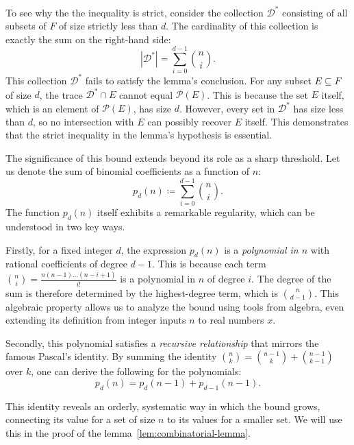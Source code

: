\begin{remark}

    To see why the the inequality is strict, consider the collection $\mathcal{D}^*$ consisting of all subsets of $F$ of size strictly less than $d$. The cardinality of this collection is exactly the sum on the right-hand side:
    \[
        |\mathcal{D}^*| = \sum_{i=0}^{d-1}\binom{n}{i}.
    \]
    This collection $\mathcal{D}^*$ fails to satisfy the lemma's conclusion. For any subset $E \subseteq F$ of size $d$, the trace $\mathcal{D}^* \cap E$ cannot equal $\mathcal{P}(E)$. This is because the set $E$ itself, which is an element of $\mathcal{P}(E)$, has size $d$. However, every set in $\mathcal{D}^*$ has size less than $d$, so no intersection with $E$ can possibly recover $E$ itself. This demonstrates that the strict inequality in the lemma's hypothesis is essential.

    The significance of this bound extends beyond its role as a sharp threshold. Let us denote the sum of binomial coefficients as a function of $n$:
    \begin{equation}
        \label{eq:def-pascal-identity}
        p_d(n) \coloneq \sum_{i=0}^{d-1}\binom{n}{i}.
    \end{equation}
    The function $p_d(n)$ itself exhibits a remarkable regularity, which can be understood in two key ways.

    Firstly, for a fixed integer $d$, the expression $p_d(n)$ is a \textit{polynomial in $n$} with rational coefficients of degree $d-1$. This is because each term $\binom{n}{i} = \frac{n(n-1)\dots(n-i+1)}{i!}$ is a polynomial in $n$ of degree $i$. The degree of the sum is therefore determined by the highest-degree term, which is $\binom{n}{d-1}$. This algebraic property allows us to analyze the bound using tools from algebra, even extending its definition from integer inputs $n$ to real numbers $x$.

    Secondly, this polynomial satisfies a \textit{recursive relationship} that mirrors the famous Pascal's identity. By summing the identity $\binom{n}{k} = \binom{n-1}{k} + \binom{n-1}{k-1}$ over $k$, one can derive the following  for the polynomials:
    \begin{equation}
        \label{eq:pascal-identity}
        p_d(n) = p_d(n-1) + p_{d-1}(n-1).
    \end{equation}

    This identity reveals an orderly, systematic way in which the bound grows, connecting its value for a set of size $n$ to its values for a smaller set. We will use this in the proof of the lemma~\ref{lem:combinatorial-lemma}.

\end{remark}


